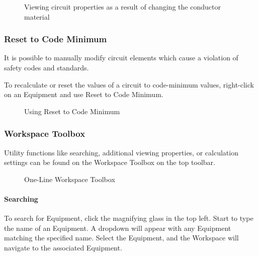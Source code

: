 \documentclass[letterpaper,10pt,english]{sphinxmanual}
\begin{document}
\begin{figure}[H]
\centering
\capstart

\noindent{}
\caption{Viewing circuit properties as a result of changing the conductor material}\label{\detokenize{docs/userguide/buildingelectricalmodel/one-line/index-one-line:id15}}\end{figure}


\subsubsection{Reset to Code Minimum}
\label{\detokenize{docs/userguide/buildingelectricalmodel/one-line/index-one-line:reset-to-code-minimum}}\label{\detokenize{docs/userguide/buildingelectricalmodel/one-line/index-one-line:one-line-reset-to-code-minimum}}
It is possible to manually modify circuit elements which cause a violation of safety codes and standards.

To recalculate or reset the values of a circuit to code-minimum values, right-click on an Equipment and use Reset to Code Minimum.

\begin{figure}[H]
\centering
\capstart

\noindent{}
\caption{Using Reset to Code Minimum}\label{\detokenize{docs/userguide/buildingelectricalmodel/one-line/index-one-line:id16}}\end{figure}


\subsubsection{Workspace Toolbox}
\label{\detokenize{docs/userguide/buildingelectricalmodel/one-line/index-one-line:workspace-toolbox}}
Utility functions like searching, additional viewing properties, or calculation settings can be found on the Workspace Toolbox on the top toolbar.

\begin{figure}[H]
\centering
\capstart

\noindent{}
\caption{One-Line Workspace Toolbox}\label{\detokenize{docs/userguide/buildingelectricalmodel/one-line/index-one-line:id17}}\end{figure}


\paragraph{Searching}
\label{\detokenize{docs/userguide/buildingelectricalmodel/one-line/index-one-line:searching}}
To search for Equipment, click the magnifying glass in the top left.  Start to type the name of an Equipment.  A dropdown will appear with any Equipment matching the specified name.  Select the Equipment, and the Workspace will navigate to the associated Equipment.
\end{document}
